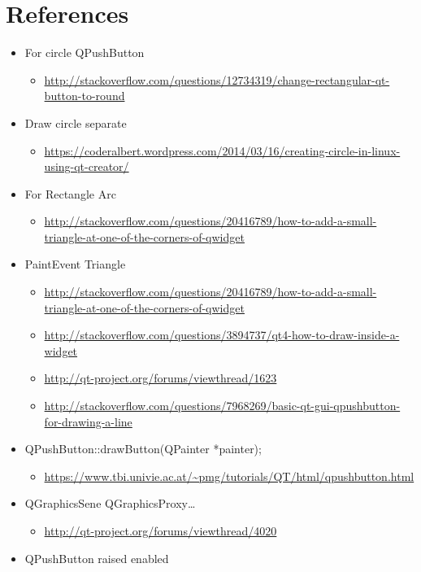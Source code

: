 \documentclass[9pt,b5paper]{article}
\begin{document}
\section{References}
\label{sec-10}
\begin{itemize}
\item For circle QPushButton
\begin{itemize}
\item \url{http://stackoverflow.com/questions/12734319/change-rectangular-qt-button-to-round}
\end{itemize}
\item Draw circle separate
\begin{itemize}
\item \url{https://coderalbert.wordpress.com/2014/03/16/creating-circle-in-linux-using-qt-creator/}
\end{itemize}
\item For Rectangle Arc
\begin{itemize}
\item \url{http://stackoverflow.com/questions/20416789/how-to-add-a-small-triangle-at-one-of-the-corners-of-qwidget}
\end{itemize}
\item PaintEvent Triangle
\begin{itemize}
\item \url{http://stackoverflow.com/questions/20416789/how-to-add-a-small-triangle-at-one-of-the-corners-of-qwidget}
\item \url{http://stackoverflow.com/questions/3894737/qt4-how-to-draw-inside-a-widget}
\item \url{http://qt-project.org/forums/viewthread/1623}
\item \url{http://stackoverflow.com/questions/7968269/basic-qt-gui-qpushbutton-for-drawing-a-line}
\end{itemize}
\item QPushButton::drawButton(QPainter *painter);
\begin{itemize}
\item \url{https://www.tbi.univie.ac.at/~pmg/tutorials/QT/html/qpushbutton.html}
\end{itemize}
\item QGraphicsSene QGraphicsProxy\ldots{}
\begin{itemize}
\item \url{http://qt-project.org/forums/viewthread/4020}
\end{itemize}
\item QPushButton raised enabled
\begin{itemize}

\end{itemize}
\end{itemize}
\end{document}
